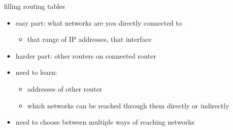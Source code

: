 \begin{frame}{filling routing tables}
    \begin{itemize}
    \item easy part: what networks are you directly connected to
        \begin{itemize}
        \item that range of IP addresses, that interface
        \end{itemize}
    \vspace{.5cm}
    \item harder part: other routers on connected router
    \item need to learn:
        \begin{itemize}
        \item addresses of other router
        \item which networks can be reached through them directly or indirectly
        \end{itemize}
    \item need to choose between multiple ways of reaching networks
    \end{itemize}
\end{frame}
